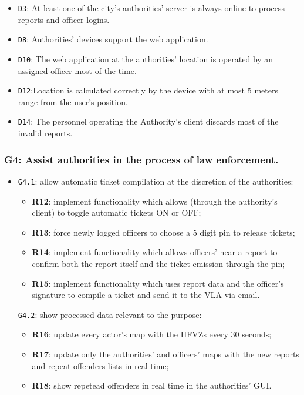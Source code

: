 \documentclass[12pt,a4paper]{article}
\begin{document}
	\begin{itemize}
			\item \texttt{D3}: At least one of the city's authorities' server is always online to process reports and officer logins.
			\item \texttt{D8}: Authorities' devices support the web application.
			\item \texttt{D10}: The web application at the authorities' location is operated by an assigned officer most of the time.
			\item \texttt{D12}:Location is calculated correctly by the device with at most 5 meters range from the user's position.
			\item \texttt{D14}: The personnel operating the Authority's client discards most of the invalid reports.
	\end{itemize}

\subsubsection{G4:  Assist authorities in the process of law enforcement.}
	
	\begin{itemize}
	\item \texttt{G4.1}: allow automatic ticket compilation at the discretion of the authorities:
							\begin{itemize}
									\item \textbf{R12}: implement functionality which allows (through the authority's client) to toggle automatic tickets ON or OFF;
									\item \textbf{R13}: force newly logged officers to choose a 5 digit pin to release tickets;
									\item \textbf{R14}: implement functionality which allows officers' near a report to confirm both the report itself and the ticket emission through the pin;
									\item \textbf{R15}: implement functionality which uses report data and the officer's signature to compile a ticket and send it to the VLA via email.
							\end{itemize}
	\texttt{G4.2}: show processed data relevant to the purpose:
							\begin{itemize}
									\item \textbf{R16}: update every actor's map with the HFVZs every 30 seconds;
									\item \textbf{R17}: update only the authorities' and officers' maps with the new reports and repeat offenders lists in real time;
									\item \textbf{R18}: show repetead offenders in real time in the authorities' GUI.
							\end{itemize}
	\end{itemize}
	
\end{document}
